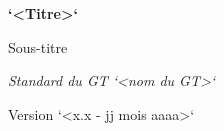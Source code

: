 \documentclass[a4paper,12pt]{article}
\begin{document}
\begin{titlepage}
    {\Large\bfseries `<Titre>` \par}

    \vspace{0.5cm}

    {\Large Sous-titre \par}  %

    \vfill

    {\Large\itshape Standard du GT `<nom du GT>` \par}    %
    \vspace{0.5cm}
    {\large Version `<x.x - jj mois aaaa>` \par}    %

\end{titlepage}

\newpage
\thispagestyle{empty}       %
\mbox{}
\newpage
\end{document}
